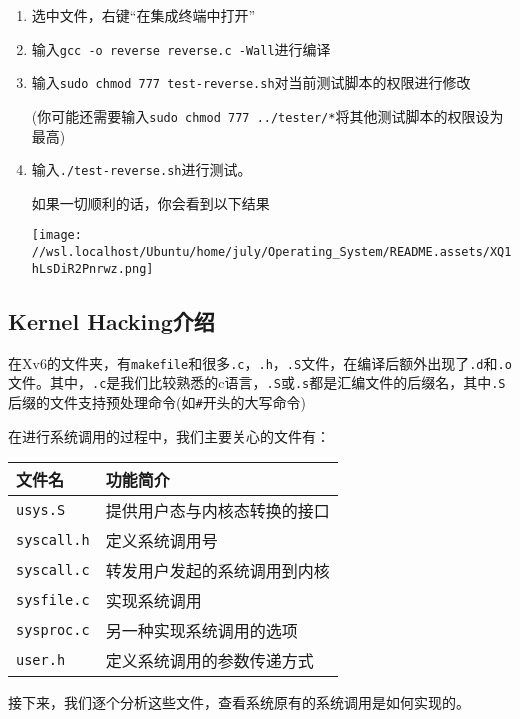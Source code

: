 \documentclass[
]{article}
\begin{document}
\begin{enumerate}
  \def\labelenumi{\arabic{enumi}.}
  \item
        选中文件，右键``在集成终端中打开''
  \item
        输入\texttt{gcc\ -o\ reverse\ reverse.c\ -Wall}进行编译
  \item
        输入\texttt{sudo\ chmod\ 777\ test-reverse.sh}对当前测试脚本的权限进行修改

        (你可能还需要输入\texttt{sudo\ chmod\ 777\ ../tester/*}将其他测试脚本的权限设为最高)
  \item
        输入\texttt{./test-reverse.sh}进行测试。

        如果一切顺利的话，你会看到以下结果

        \texttt{[image: //wsl.localhost/Ubuntu/home/july/Operating\_System/README.assets/XQ1hLsDiR2Pnrwz.png]}
\end{enumerate}

\subsection{Kernel Hacking介绍}\label{kernel-hackingux4ecbux7ecd}

在Xv6的文件夹，有\texttt{makefile}和很多\texttt{.c}，\texttt{.h}，\texttt{.S}文件，在编译后额外出现了\texttt{.d}和\texttt{.o}文件。其中，\texttt{.c}是我们比较熟悉的c语言，\texttt{.S}或\texttt{.s}都是汇编文件的后缀名，其中\texttt{.S}后缀的文件支持预处理命令(如\texttt{\#}开头的大写命令)

在进行系统调用的过程中，我们主要关心的文件有：

\begin{longtable}[]{@{}ll@{}}
  \toprule\noalign{}
  文件名                & 功能简介           \\
  \midrule\noalign{}
  \endhead
  \bottomrule\noalign{}
  \endlastfoot
  \texttt{usys.S}    & 提供用户态与内核态转换的接口 \\
  \texttt{syscall.h} & 定义系统调用号        \\
  \texttt{syscall.c} & 转发用户发起的系统调用到内核 \\
  \texttt{sysfile.c} & 实现系统调用         \\
  \texttt{sysproc.c} & 另一种实现系统调用的选项   \\
  \texttt{user.h}    & 定义系统调用的参数传递方式  \\
\end{longtable}

接下来，我们逐个分析这些文件，查看系统原有的系统调用是如何实现的。
\end{document}
